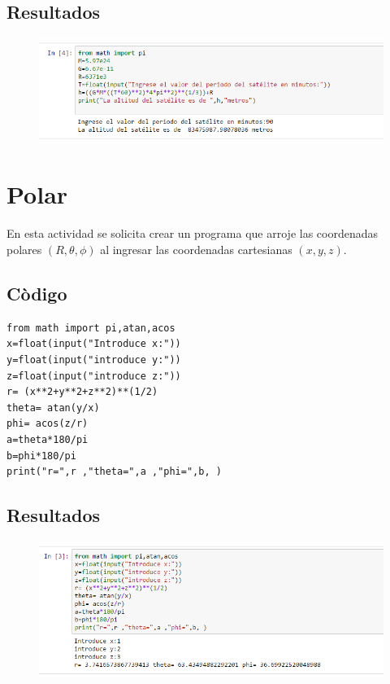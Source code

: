 \documentclass[12pt]{article}
\begin{document}
\subsection{Resultados}
\begin{figure}[H]
\centering
\includegraphics[scale=.8]{altitud}
\end{figure}
\pagebreak
\section{Polar}
En esta actividad se solicita crear un programa que arroje las coordenadas polares $(R,\theta,\phi)$ al ingresar las coordenadas cartesianas $(x,y,z)$.
\subsection{Còdigo}

\begin{verbatim}
from math import pi,atan,acos
x=float(input("Introduce x:"))
y=float(input("introduce y:"))
z=float(input("introduce z:"))
r= (x**2+y**2+z**2)**(1/2)
theta= atan(y/x)
phi= acos(z/r)
a=theta*180/pi
b=phi*180/pi
print("r=",r ,"theta=",a ,"phi=",b, )
\end{verbatim}

\subsection{Resultados}

	\begin{figure}[H]
	\centering
	\includegraphics[scale=.8]{polar}
	\end{figure}
\pagebreak
\end{document}
